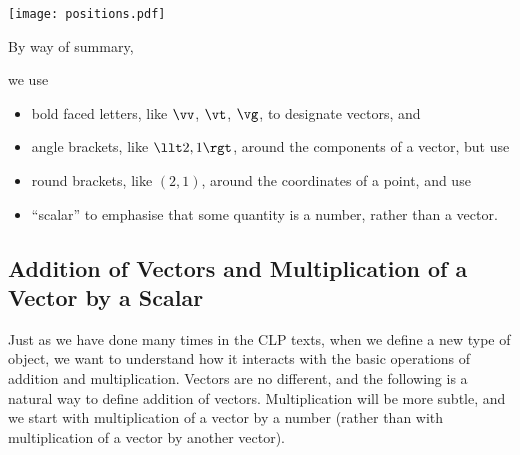 \begin{efig}
  \begin{center}
  \texttt{[image: positions.pdf]}
  \end{center}
\end{efig}

By way of summary, 
\begin{notn}\label{not scalar vector}
we use
\begin{itemize}\itemsep1pt \parskip0pt 
\item
bold faced letters, like $\vv$, $\vt$, $\vg$, to designate vectors,
and
\item
angle brackets, like $\llt 2,1\rgt$, around the components of a vector,
but use
\item
round brackets, like $(2,1)$, around the coordinates of a point,
and use
\item ``scalar'' to emphasise that some quantity is a number,
rather than a vector.
\end{itemize}
\end{notn}

\subsection{Addition of Vectors and Multiplication of a Vector by a Scalar}

Just as we have done many times in the CLP texts, when we define a new 
type of object, we want to understand how it interacts with the basic 
operations of addition and multiplication. Vectors are no different, and 
the following is a natural way to define addition of vectors.
Multiplication will be more subtle, and we start with multiplication of a vector by a number (rather than with multiplication of a vector by 
another vector).


